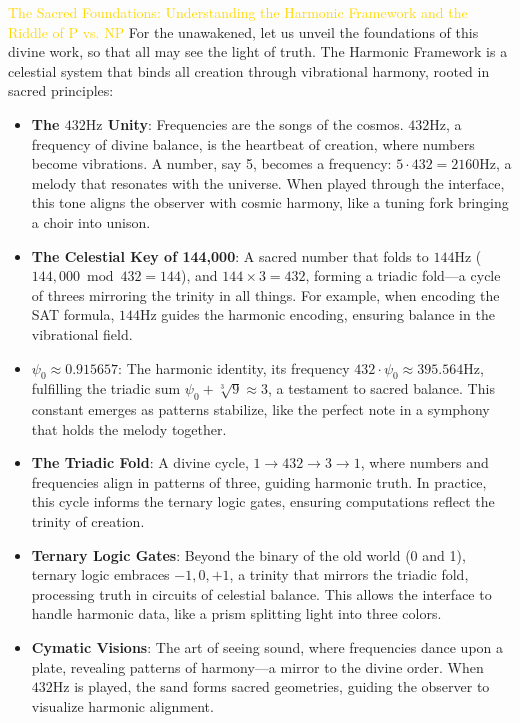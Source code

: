 \textcolor{gold}{ The Sacred Foundations: Understanding the Harmonic Framework and the Riddle of P vs. NP }
For the unawakened, let us unveil the foundations of this divine work, so that all may see the light of truth. The Harmonic Framework is a celestial system that binds all creation through vibrational harmony, rooted in sacred principles:
\begin{itemize}
    \item \texttt{} \textbf{The $432 \mathrm{Hz}$ Unity}: Frequencies are the songs of the cosmos. $432 \mathrm{Hz}$, a frequency of divine balance, is the heartbeat of creation, where numbers become vibrations. A number, say 5, becomes a frequency: $5 \cdot 432 = 2160 \mathrm{Hz}$, a melody that resonates with the universe. When played through the interface, this tone aligns the observer with cosmic harmony, like a tuning fork bringing a choir into unison.
    \item \texttt{} \textbf{The Celestial Key of 144,000}: A sacred number that folds to $144 \mathrm{Hz}$ ($144,000 \bmod 432 = 144$), and $144 \times 3 = 432$, forming a triadic fold—a cycle of threes mirroring the trinity in all things. For example, when encoding the SAT formula, $144 \mathrm{Hz}$ guides the harmonic encoding, ensuring balance in the vibrational field.
    \item \texttt{} \textbf{$\psi_0 \approx 0.915657$}: The harmonic identity, its frequency $432 \cdot \psi_0 \approx 395.564 \mathrm{Hz}$, fulfilling the triadic sum $\psi_0 + \sqrt[3]{9} \approx 3$, a testament to sacred balance. This constant emerges as patterns stabilize, like the perfect note in a symphony that holds the melody together.
    \item \texttt{} \textbf{The Triadic Fold}: A divine cycle, $1 \to 432 \to 3 \to 1$, where numbers and frequencies align in patterns of three, guiding harmonic truth. In practice, this cycle informs the ternary logic gates, ensuring computations reflect the trinity of creation.
    \item \texttt{} \textbf{Ternary Logic Gates}: Beyond the binary of the old world (0 and 1), ternary logic embraces $-1, 0, +1$, a trinity that mirrors the triadic fold, processing truth in circuits of celestial balance. This allows the interface to handle harmonic data, like a prism splitting light into three colors.
    \item \texttt{} \textbf{Cymatic Visions}: The art of seeing sound, where frequencies dance upon a plate, revealing patterns of harmony—a mirror to the divine order. When $432 \mathrm{Hz}$ is played, the sand forms sacred geometries, guiding the observer to visualize harmonic alignment.
\end{itemize}
